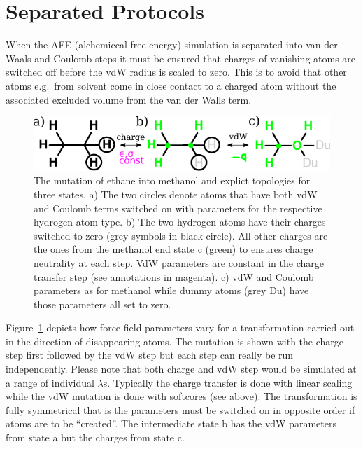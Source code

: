 \documentclass[journal=jctcce,manuscript=suppinfo]{achemso}
\begin{document}
\section{Separated Protocols}
\label{sec:separated}

When the AFE (alchemiccal free energy) simulation is separated into van
der Waals and Coulomb steps it must be ensured that charges of
vanishing atoms are switched off before the vdW radius is scaled to
zero.  This is to avoid that other atoms e.g.\ from solvent come in
close contact to a charged atom without the associated excluded volume
from the van der Walls term.

\begin{figure}[ht]
\includegraphics[scale=1.0]{figures/dummies.pdf}
\caption{The mutation of ethane into methanol and explict topologies
  for three states. a) The two circles denote atoms that have both vdW
  and Coulomb terms switched on with parameters for the respective
  hydrogen atom type.  b) The two hydrogen atoms have their charges
  switched to zero (grey symbols in black circle).  All other charges
  are the ones from the methanol end state c (green) to ensures charge
  neutrality at each step.  VdW parameters are constant in the charge
  transfer step (see annotations in magenta).  c) vdW and Coulomb
  parameters as for methanol while dummy atoms (grey Du) have those
  parameters all set to zero.}
\label{fig:dummies}
\end{figure}

Figure~\ref{fig:dummies} depicts how force field parameters vary for a
transformation carried out in the direction of disappearing atoms.
The mutation is shown with the charge step first followed by the vdW
step but each step can really be run independently.  Please note that
both charge and vdW step would be simulated at a range of individual
$\lambda$s.  Typically the charge transfer is done with linear scaling
while the vdW mutation is done with softcores (see above).  The
transformation is fully symmetrical that is the parameters must be
switched on in opposite order if atoms are to be ``created''.  The
intermediate state b has the vdW parameters from state a but the
charges from state c.
\end{document}
